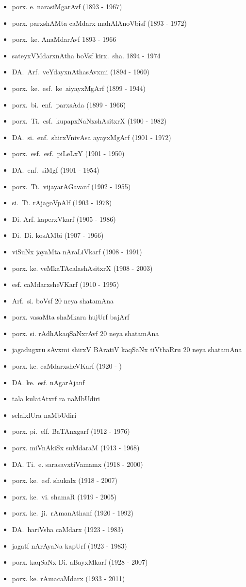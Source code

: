 {\begin{itemize}
\item porx. e. narasiMgarAvf {\rm (1893 - 1967)}
\item porx. parxshAMta caMdarx mahAlAnoVbisf {\rm (1893 - 1972)}
\item porx.~ke. AnaMdarAvf {\rm 1893 - 1966}
\item sateyxVMdarxnAtha boVsf kirx.~sha. {\rm 1894 - 1974}
\item DA.~Arf.~veYdayxnAthasAvxmi {\rm (1894 - 1960)}
\item porx.~ke.~esf.~ke~aiyayxMgArf {\rm (1899 - 1944)}
\item porx.~bi.~enf.~parxsAda {\rm (1899 - 1966)}
\item porx.~Ti.~esf.~kupapxNaNxshAsitxrX {\rm (1900 - 1982)}
\item DA.~si.~enf.~shirxVnivAsa ayayxMgArf {\rm (1901 - 1972)}
\item porx.~esf.~esf.~piLeLxY {\rm (1901 - 1950)}
\item DA.~enf.~siMgf {\rm (1901 - 1954)}
\item porx.~Ti.~vijayarAGavanf {\rm (1902 - 1955)}
\item si.~Ti. rAjagoVpAlf {\rm (1903 - 1978)}
\item Di. Arf. kaperxVkarf {\rm (1905 - 1986)}
\item Di.~Di. kosAMbi {\rm (1907 - 1966)}
\item viSuNx jayaMta nAraLiVkarf {\rm (1908 - 1991)}
\item porx. ke. veMkaTAcalashAsitxrX {\rm (1908 - 2003)}
\item esf. caMdarxsheVKarf {\rm (1910 - 1995)}
\item Arf.~si. boVsf {\rm 20} neya shatamAna
\item porx. vasaMta shaMkara hujUrf bajArf
\item porx. si. rAdhAkaqSaNxrAvf {\rm 20} neya shatamAna
\item jagadugxru sAvxmi shirxV BAratiV kaqSaNx tiVthaRru {\rm 20} neya shatamAna
\item porx. ke. caMdarxsheVKarf {\rm (1920 - )}
\item DA. ke.~esf. nAgarAjanf
\item tala kulatAtxrf ra naMbUdiri
\item selalxlUra naMbUdiri
\item porx. pi.~elf. BaTAnxgarf {\rm (1912 - 1976)}
\item porx. miVnAkiSx suMdaraM {\rm (1913 - 1968)}
\item DA. Ti.~e. sarasavxtiVamamx {\rm (1918 - 2000)}
\item porx. ke.~esf. shukalx {\rm (1918 - 2007)}
\item porx. ke.~vi. shamaR {\rm (1919 - 2005)}
\item porx. ke.~ji.~rAmanAthanf {\rm (1920 - 1992)}
\item DA.~hariVsha caMdarx {\rm (1923 - 1983)}
\item jagatf nArAyaNa kapUrf {\rm (1923 - 1983)}
\item porx. kaqSaNx Di. aBayxMkarf {\rm (1928 - 2007)}
\item porx. ke. rAmacaMdarx {\rm (1933 - 2011)}
\end{itemize}}


